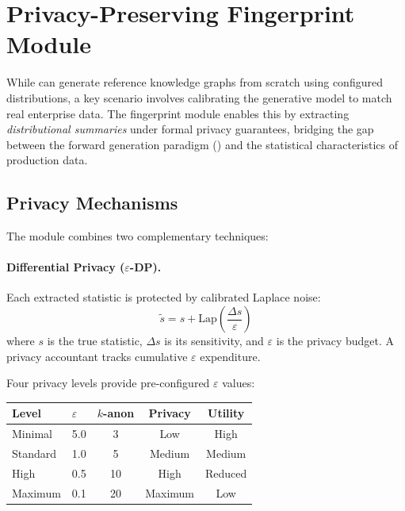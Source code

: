 \section{Privacy-Preserving Fingerprint Module}
\label{sec:privacy}

While \system{} can generate reference knowledge graphs from scratch
using configured distributions, a key scenario involves calibrating
the generative model to match real enterprise data.  The fingerprint
module enables this by extracting \emph{distributional summaries} under
formal privacy guarantees, bridging the gap between the forward
generation paradigm () and the statistical
characteristics of production data.

\subsection{Privacy Mechanisms}
\label{sec:priv_mechanisms}

The module combines two complementary techniques:

\paragraph{Differential Privacy ($\varepsilon$-DP).}
Each extracted statistic is protected by calibrated Laplace noise:
\begin{equation}
\tilde{s} = s + \text{Lap}\!\left(\frac{\Delta s}{\varepsilon}\right)
\label{eq:dp_laplace}
\end{equation}
where $s$ is the true statistic, $\Delta s$ is its sensitivity, and
$\varepsilon$ is the privacy budget.  A privacy accountant tracks
cumulative $\varepsilon$ expenditure.

Four privacy levels provide pre-configured $\varepsilon$ values:

\begin{center}
\begin{tabular}{llccc}
\toprule
\textbf{Level} & \textbf{$\varepsilon$} & \textbf{$k$-anon}
  & \textbf{Privacy} & \textbf{Utility} \\
\midrule
Minimal  & 5.0 & 3  & Low    & High \\
Standard & 1.0 & 5  & Medium & Medium \\
High     & 0.5 & 10 & High   & Reduced \\
Maximum  & 0.1 & 20 & Maximum & Low \\
\bottomrule
\end{tabular}
\end{center}

